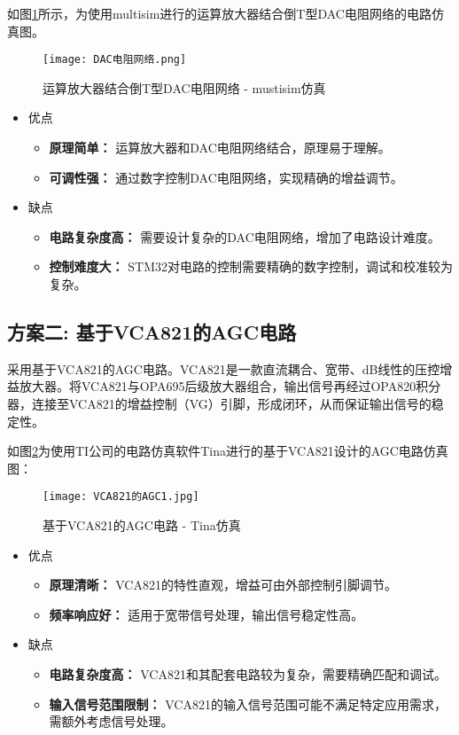 \documentclass[lang=cn,11pt,a4paper]{elegantpaper}
\begin{document}
如图\ref{fig:DAC_net}所示，为使用multisim进行的运算放大器结合倒T型DAC电阻网络的电路仿真图。
\begin{figure}[!htb]
  \centering
  \texttt{[image: DAC电阻网络.png]}
  \caption{运算放大器结合倒T型DAC电阻网络 - mustisim仿真}
  \label{fig:DAC_net}
\end{figure}

\begin{itemize}
  \item 优点
        \begin{itemize}
          \item \textbf{原理简单：} 运算放大器和DAC电阻网络结合，原理易于理解。
          \item \textbf{可调性强：} 通过数字控制DAC电阻网络，实现精确的增益调节。
        \end{itemize}

  \item  缺点
        \begin{itemize}
          \item \textbf{电路复杂度高：} 需要设计复杂的DAC电阻网络，增加了电路设计难度。
          \item \textbf{控制难度大：} STM32对电路的控制需要精确的数字控制，调试和校准较为复杂。
        \end{itemize}
\end{itemize}
\subsection{方案二: 基于VCA821的AGC电路}

采用基于VCA821的AGC电路。VCA821是一款直流耦合、宽带、dB线性的压控增益放大器。将VCA821与OPA695后级放大器组合，输出信号再经过OPA820积分器，连接至VCA821的增益控制（VG）引脚，形成闭环，从而保证输出信号的稳定性。

如图\ref{fig:vca_agc}为使用TI公司的电路仿真软件Tina进行的基于VCA821设计的AGC电路仿真图：
\begin{figure}[!htb]
  \centering
  \texttt{[image: VCA821的AGC1.jpg]}
  \caption{基于VCA821的AGC电路 - Tina仿真}
  \label{fig:vca_agc}
\end{figure}

\begin{itemize}
  \item 优点
        \begin{itemize}
          \item \textbf{原理清晰：} VCA821的特性直观，增益可由外部控制引脚调节。
          \item \textbf{频率响应好：} 适用于宽带信号处理，输出信号稳定性高。
        \end{itemize}

  \item 缺点
        \begin{itemize}
          \item \textbf{电路复杂度高：} VCA821和其配套电路较为复杂，需要精确匹配和调试。
          \item \textbf{输入信号范围限制：} VCA821的输入信号范围可能不满足特定应用需求，需额外考虑信号处理。
        \end{itemize}
\end{itemize}
\end{document}
